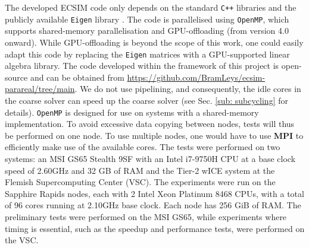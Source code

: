 The developed ECSIM code only depends on the standard \texttt{C++} libraries and the publicly available \texttt{Eigen} library \cite{gael_guennebaud_and_benoit_jacob_and_others_eigen_2010}. The code is parallelised using \texttt{OpenMP}, which supports shared-memory parallelisation and GPU-offloading (from version 4.0 onward). While GPU-offloading is beyond the scope of this work, one could easily adapt this code by replacing the \texttt{Eigen} matrices with a GPU-supported linear algebra library. The code developed within the framework of this project is open-source and can be obtained from \url{https://github.com/BramLeys/ecsim-parareal/tree/main}. We do not use pipelining, and consequently, the idle cores in the coarse solver can speed up the coarse solver (see Sec. \ref{sub: subcycling} for details).
\texttt{OpenMP} is designed for use on systems with a shared-memory implementation. To avoid excessive data copying between nodes, tests will thus be performed on one node.
To use multiple nodes, one would have to use \textbf{MPI} to efficiently make use of the available cores.
The tests were performed on two systems: an MSI GS65 Stealth 9SF with an Intel i7-9750H CPU at a base clock speed of 2.60GHz and 32 GB of RAM and the Tier-2 wICE system at the Flemish Supercomputing Center (VSC). The experiments were run on the Sapphire Rapids nodes, each with 2 Intel Xeon Platinum 8468 CPUs, with a total of 96 cores running at 2.10GHz base clock. Each node has 256 GiB of RAM. The preliminary tests were performed on the MSI GS65, while experiments where timing is essential, such as the speedup and performance tests, were performed on the VSC. 

 
